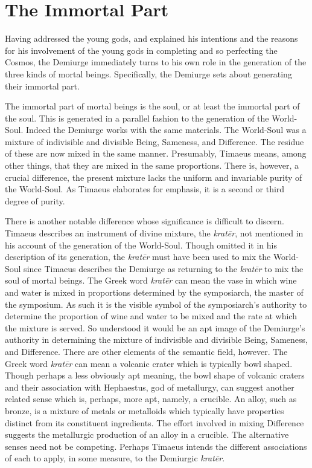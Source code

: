 
\section{The Immortal Part} %
\label{sec:the_immortal_part}

Having addressed the young gods, and explained his intentions and the reasons for his involvement of the young gods in completing and so perfecting the Cosmos, the Demiurge immediately turns to his own role in the generation of the three kinds of mortal beings. Specifically, the Demiurge sets about generating their immortal part. 

The immortal part of mortal beings is the soul, or at least the immortal part of the soul. This is generated in a parallel fashion to the generation of the World-Soul. Indeed the Demiurge works with the same materials. The World-Soul was a mixture of indivisible and divisible Being, Sameness, and Difference. The residue of these are now mixed in the same manner. Presumably, Timaeus means, among other things, that they are mixed in the same proportions. There is, however, a crucial difference, the present mixture lacks the uniform and invariable purity of the World-Soul. As Timaeus elaborates for emphasis, it is a second or third degree of purity. 


There is another notable difference whose significance is difficult to discern. Timaeus describes an instrument of divine mixture, the \emph{kratēr}, not mentioned in his account of the generation of the World-Soul. Though omitted it in his description of its generation, the \emph{kratēr} must have been used to mix the World-Soul since Timaeus describes the Demiurge as returning to the \emph{kratēr} to mix the soul of mortal beings. The Greek word \emph{kratēr} can mean the vase in which wine and water is mixed in proportions determined by the symposiarch, the master of the symposium. As such it is the visible symbol of the symposiarch's authority to determine the proportion of wine and water to be mixed and the rate at which the mixture is served. So understood it would be an apt image of the Demiurge's authority in determining the mixture of indivisible and divisible Being, Sameness, and Difference. There are other elements of the semantic field, however. The Greek word \emph{kratēr} can mean a volcanic crater which is typically bowl shaped. Though perhaps a less obviously apt meaning, the bowl shape of volcanic craters and their association with Hephaestus, god of metallurgy, can suggest another related sense which is, perhaps, more apt, namely, a crucible. An alloy, such as bronze, is a mixture of metals or metalloids which typically have properties distinct from its constituent ingredients. The effort involved in mixing Difference suggests the metallurgic production of an alloy in a crucible. The alternative senses need not be competing. Perhaps Timaeus intends the different associations of each to apply, in some measure, to the Demiurgic \emph{kratēr}.

